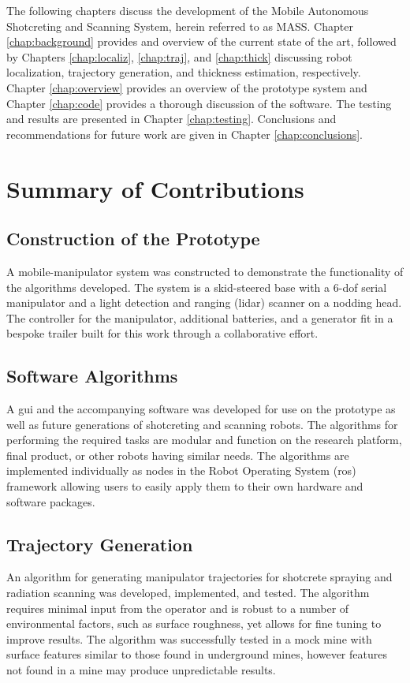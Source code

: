 The following chapters discuss the development of the Mobile Autonomous Shotcreting and Scanning System, herein referred to as MASS. Chapter \ref{chap:background} provides and overview of the current state of the art, followed by Chapters \ref{chap:localiz}, \ref{chap:traj}, and \ref{chap:thick} discussing robot localization, trajectory generation, and thickness estimation, respectively. Chapter \ref{chap:overview} provides an overview of the prototype system and Chapter \ref{chap:code} provides a thorough discussion of the software. The testing and results are presented in Chapter \ref{chap:testing}. Conclusions and recommendations for future work are given in Chapter \ref{chap:conclusions}.\\
\section{Summary of Contributions}
\label{sec:contributions}

\subsection{Construction of the Prototype}
A mobile-manipulator system was constructed to demonstrate the functionality of the algorithms developed. The system is a skid-steered base with a 6-\acrshort{dof} serial manipulator and a light detection and ranging (\acrshort{lidar}) scanner on a nodding head. The controller for the manipulator, additional batteries, and a generator fit in a bespoke trailer built for this work through a collaborative effort.\\

\subsection{Software Algorithms}
A \acrshort{gui} and the accompanying software was developed for use on the prototype as well as future generations of shotcreting and scanning robots. The algorithms for performing the required tasks are modular and  function on the research platform, final product, or other robots having similar needs. The algorithms are implemented individually as nodes in the Robot Operating System (\acrshort{ros}) framework allowing users to easily apply them to their own hardware and software packages.\\

\subsection{Trajectory Generation}
An algorithm for generating manipulator trajectories for shotcrete spraying and radiation scanning was developed, implemented, and tested. The algorithm requires minimal input from the operator and is robust to a number of environmental factors, such as surface roughness, yet allows for fine tuning to improve results. The algorithm was successfully tested in a mock mine with surface features similar to those found in underground mines, however features not found in a mine may produce unpredictable results.\\

